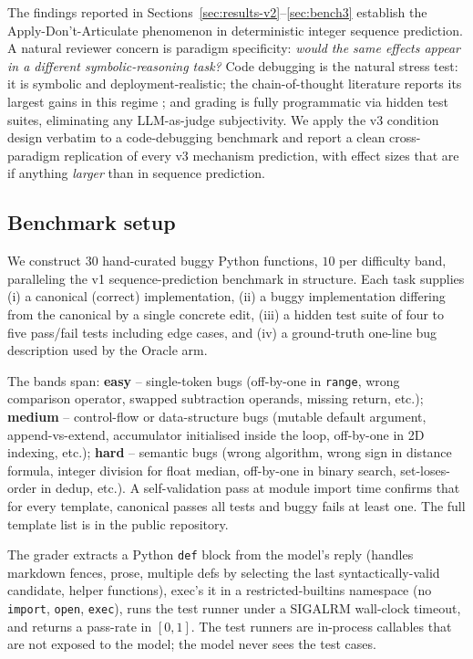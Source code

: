 \documentclass[11pt]{article}
\begin{document}
The findings reported in Sections~\ref{sec:results-v2}--\ref{sec:bench3}
establish the Apply-Don't-Articulate phenomenon in deterministic
integer sequence prediction.  A natural reviewer concern is paradigm
specificity: \emph{would the same effects appear in a different
symbolic-reasoning task?}  Code debugging is the natural stress test:
it is symbolic and deployment-realistic; the chain-of-thought
literature reports its largest gains in this regime
\citep{wei2022chain,sprague2024cot}; and grading is fully programmatic
via hidden test suites, eliminating any LLM-as-judge subjectivity.
We apply the v3 condition design verbatim to a code-debugging
benchmark and report a clean cross-paradigm replication of every
v3 mechanism prediction, with effect sizes that are if anything
\emph{larger} than in sequence prediction.

\subsection{Benchmark setup}

We construct $30$ hand-curated buggy Python functions, $10$ per
difficulty band, paralleling the v1 sequence-prediction benchmark
in structure.  Each task supplies (i) a canonical (correct)
implementation, (ii) a buggy implementation differing from the
canonical by a single concrete edit, (iii) a hidden test suite
of four to five pass/fail tests including edge cases, and
(iv) a ground-truth one-line bug description used by the Oracle
arm.

The bands span: \textbf{easy} -- single-token bugs (off-by-one in
\verb|range|, wrong comparison operator, swapped subtraction
operands, missing return, etc.); \textbf{medium} -- control-flow
or data-structure bugs (mutable default argument, append-vs-extend,
accumulator initialised inside the loop, off-by-one in 2D
indexing, etc.); \textbf{hard} -- semantic bugs (wrong algorithm,
wrong sign in distance formula, integer division for float median,
off-by-one in binary search, set-loses-order in dedup, etc.).
A self-validation pass at module import time confirms that for
every template, canonical passes all tests and buggy fails at
least one.  The full template list is in the public repository.

The grader extracts a Python \verb|def| block from the model's
reply (handles markdown fences, prose, multiple defs by selecting
the last syntactically-valid candidate, helper functions),
exec's it in a restricted-builtins namespace (no \verb|import|,
\verb|open|, \verb|exec|), runs the test runner under a SIGALRM
wall-clock timeout, and returns a pass-rate in $[0, 1]$.  The
test runners are in-process callables that are not exposed to
the model; the model never sees the test cases.
\end{document}
